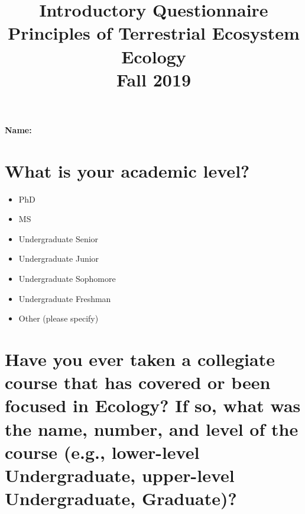 \documentclass[12pt, notitlepage]{article}   	%
\title{
	\textbf{
		Introductory Questionnaire
	} \\
	\large{Principles of Terrestrial Ecosystem Ecology} \\
	\large{Fall 2019}
}
\date{\vspace{-5ex}}
\def\wl{\par \vspace{\baselineskip}}
\begin{document}
{\selectfont %

\maketitle

\Large{\textbf{Name:} \underline{\hspace{10cm}}}

\section{What is your academic level?}
\begin{itemize}
	\item{\underline{\hspace{1cm}} PhD}
	\item{\underline{\hspace{1cm}} MS}
	\item{\underline{\hspace{1cm}} Undergraduate Senior}
	\item{\underline{\hspace{1cm}} Undergraduate Junior}
	\item{\underline{\hspace{1cm}} Undergraduate Sophomore}
	\item{\underline{\hspace{1cm}} Undergraduate Freshman}
	\item{\underline{\hspace{1cm}} Other (please specify)}
\end{itemize}

\section{Have you ever taken a collegiate course that has covered or been focused in 
Ecology? If so, what was the name, number, and level of the course (e.g., lower-level Undergraduate,
upper-level Undergraduate, Graduate)?}

\wl
\wl
\wl
\wl
\wl
\wl
\wl
\wl

\newpage

}
\end{document}
